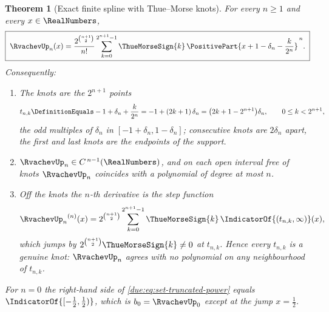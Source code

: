\documentclass[11pt,oneside]{article}
\theoremstyle{plain}
\newtheorem{theorem}{Theorem}[section]
\theoremstyle{definition}
\theoremstyle{remark}
\newcommand{\upn}[1]{\RvachevUp_{#1}}
\begin{document}
\begin{theorem}[Exact finite spline with Thue--Morse knots]
\label{due:thm:set-finite-spline}
For every $n\ge1$ and every $x\in\RealNumbers$,
\begin{equation}
 \boxed{\;
 \upn{n}(x)=\frac{2^{\binom{n+1}{2}}}{n!}
 \sum_{k=0}^{2^{n+1}-1}\ThueMorseSign{k}\,
 \PositivePart{x+1-\delta_n-\frac{k}{2^{n}}}^{\,n}.\;}
 \label{due:eq:set-truncated-power}
\end{equation}
Consequently:
\begin{enumerate}
\item The knots are the $2^{n+1}$ points
      \begin{equation}
       t_{n,k}\DefinitionEquals-1+\delta_n+\frac{k}{2^{n}}
       =-1+(2k+1)\,\delta_n
       =\bigl(2k+1-2^{n+1}\bigr)\delta_n,
       \qquad 0\le k<2^{n+1},
       \label{due:eq:set-knots}
      \end{equation}
      the odd multiples of $\delta_n$ in $[-1+\delta_n,1-\delta_n]$;
      consecutive knots are $2\delta_n$ apart, the first and last knots are
      the endpoints of the support.
\item $\upn{n}\in C^{\,n-1}(\RealNumbers)$, and on each open interval free of
      knots $\upn{n}$ coincides with a polynomial of degree at most $n$.
\item Off the knots the $n$-th derivative is the step function
      \begin{equation}
       {\upn{n}}^{(n)}(x)=2^{\binom{n+1}{2}}
       \sum_{k=0}^{2^{n+1}-1}\ThueMorseSign{k}\,\IndicatorOf{(t_{n,k},\infty)}(x),
       \label{due:eq:set-nth-derivative}
      \end{equation}
      which jumps by $2^{\binom{n+1}{2}}\ThueMorseSign{k}\ne0$ at $t_{n,k}$.
      Hence every $t_{n,k}$ is a genuine knot: $\upn{n}$ agrees with no
      polynomial on any neighbourhood of $t_{n,k}$.
\end{enumerate}
For $n=0$ the right-hand side of \cref{due:eq:set-truncated-power} equals
$\IndicatorOf{[-\frac12,\frac12)}$, which is $b_0=\upn{0}$ except at the
jump $x=\frac12$.
\end{theorem}
\end{document}

